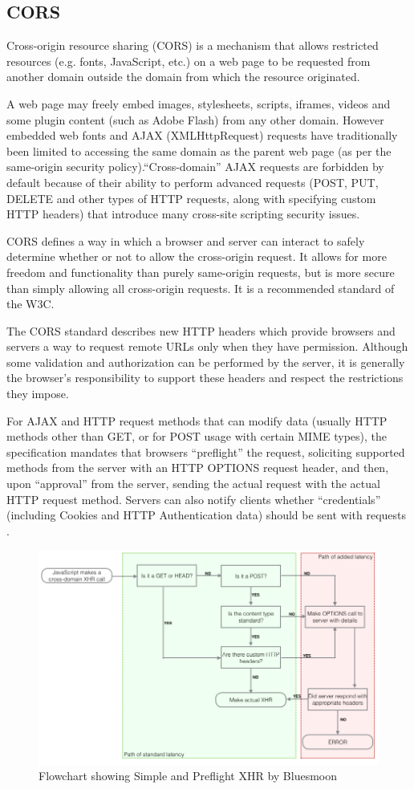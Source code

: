 \subsection{CORS}
\label{subsec:S3_cors}

Cross-origin resource sharing (CORS) is a mechanism that allows restricted resources (e.g. fonts, JavaScript, etc.) on a web page to be requested from another domain outside the domain from which the resource originated.

A web page may freely embed images, stylesheets, scripts, iframes, videos and some plugin content (such as Adobe Flash) from any other domain. However embedded web fonts and AJAX (XMLHttpRequest) requests have traditionally been limited to accessing the same domain as the parent web page (as per the same-origin security policy).``Cross-domain'' AJAX requests are forbidden by default because of their ability to perform advanced requests (POST, PUT, DELETE and other types of HTTP requests, along with specifying custom HTTP headers) that introduce many cross-site scripting security issues.

CORS defines a way in which a browser and server can interact to safely determine whether or not to allow the cross-origin request. It allows for more freedom and functionality than purely same-origin requests, but is more secure than simply allowing all cross-origin requests. It is a recommended standard of the W3C.

The CORS standard describes new HTTP headers which provide browsers and servers a way to request remote URLs only when they have permission. Although some validation and authorization can be performed by the server, it is generally the browser's responsibility to support these headers and respect the restrictions they impose.

For AJAX and HTTP request methods that can modify data (usually HTTP methods other than GET, or for POST usage with certain MIME types), the specification mandates that browsers ``preflight'' the request, soliciting supported methods from the server with an HTTP OPTIONS request header, and then, upon ``approval'' from the server, sending the actual request with the actual HTTP request method. Servers can also notify clients whether ``credentials'' (including Cookies and HTTP Authentication data) should be sent with requests \cite{s3_cors}. 

\begin {figure}[h]
\graphicspath{{images/chapter_s3/}}
\includegraphics[width=\textwidth]{cors}
\caption{Flowchart showing Simple and Preflight XHR by Bluesmoon}
\end {figure}

